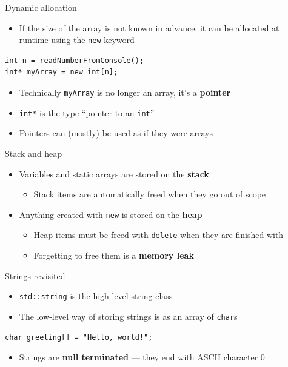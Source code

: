 \begin{frame}[fragile]{Dynamic allocation}
    \begin{itemize}
        \item If the size of the array is not known in advance, it can be allocated at runtime
            using the \lstinline{new} keyword
    \end{itemize}
    \begin{lstlisting}
int n = readNumberFromConsole();
int* myArray = new int[n];
    \end{lstlisting}
    \begin{itemize}
        \item Technically \lstinline{myArray} is no longer an array, it's a \textbf{pointer}
        \item \lstinline{int*} is the type ``pointer to an \lstinline{int}''
        \item Pointers can (mostly) be used as if they were arrays
    \end{itemize}
\end{frame}

\begin{frame}[fragile]{Stack and heap}
    \begin{itemize}
        \item Variables and static arrays are stored on the \textbf{stack}
        \begin{itemize}
            \item Stack items are automatically freed when they go out of scope
        \end{itemize}
        \item Anything created with \lstinline{new} is stored on the \textbf{heap}
        \begin{itemize}
            \item Heap items must be freed with \lstinline{delete} when they are finished with
            \item Forgetting to free them is a \textbf{memory leak}
        \end{itemize}
    \end{itemize}
\end{frame}

\begin{frame}[fragile]{Strings revisited}
    \begin{itemize}
        \item \lstinline{std::string} is the high-level string class
        \item The low-level way of storing strings is as an array of \lstinline{char}s
    \end{itemize}
    \begin{lstlisting}
char greeting[] = "Hello, world!";
    \end{lstlisting}
    \begin{itemize}
        \item Strings are \textbf{null terminated} --- they end with ASCII character 0
    \end{itemize}
\end{frame}

